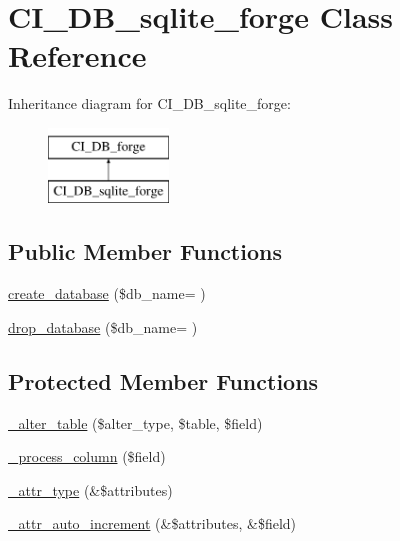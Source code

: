 \hypertarget{class_c_i___d_b__sqlite__forge}{}\section{C\+I\+\_\+\+D\+B\+\_\+sqlite\+\_\+forge Class Reference}
\label{class_c_i___d_b__sqlite__forge}
Inheritance diagram for C\+I\+\_\+\+D\+B\+\_\+sqlite\+\_\+forge\+:\begin{figure}[H]
\begin{center}
\leavevmode
\includegraphics[height=2.000000cm]{class_c_i___d_b__sqlite__forge}
\end{center}
\end{figure}
\subsection*{Public Member Functions}
\begin{DoxyCompactItemize}
\item 
\hyperlink{class_c_i___d_b__sqlite__forge_a1c08a5b4e951f158b791fedd680ba187}{create\+\_\+database} (\$db\+\_\+name= \textquotesingle{}\textquotesingle{})
\item 
\hyperlink{class_c_i___d_b__sqlite__forge_a9e0a4706cac7e0bb62e76f23081000d4}{drop\+\_\+database} (\$db\+\_\+name= \textquotesingle{}\textquotesingle{})
\end{DoxyCompactItemize}
\subsection*{Protected Member Functions}
\begin{DoxyCompactItemize}
\item 
\hyperlink{class_c_i___d_b__sqlite__forge_a41c6cae02f2fda8b429ad0afb9509426}{\+\_\+alter\+\_\+table} (\$alter\+\_\+type, \$table, \$field)
\item 
\hyperlink{class_c_i___d_b__sqlite__forge_a8f38f1c5b5dddecca4befbe393f3f299}{\+\_\+process\+\_\+column} (\$field)
\item 
\hyperlink{class_c_i___d_b__sqlite__forge_a8553be952084c6f7cdfff370a1d14f6b}{\+\_\+attr\+\_\+type} (\&\$attributes)
\item 
\hyperlink{class_c_i___d_b__sqlite__forge_a2a013a5932439c3c44f0dad3436525f7}{\+\_\+attr\+\_\+auto\+\_\+increment} (\&\$attributes, \&\$field)
\end{DoxyCompactItemize}
